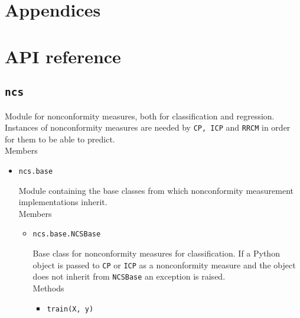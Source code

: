 \documentclass[twoside,11pt]{article}
\begin{document}
\renewcommand{\appendixpagename}{}
\begin{appendices}
  \section*{Appendices}

  \section{API reference}
  \label{appendix:a}

    \subsection*{\texttt{ncs}}

      Module for nonconformity measures, both for
      classification and regression.
      Instances of nonconformity measures are needed by
      \texttt{CP, ICP} and \texttt{RRCM} in order for them
      to be able to predict.
      \\

      Members

      \begin{itemize}

        \item
          \texttt{ncs.base}

          Module containing the base classes from which
          nonconformity measurement implementations
          inherit.
          \\

          Members

          \begin{itemize}

            \item
              \texttt{ncs.base.NCSBase}
              \label{itm:ncsbase}

              Base class for nonconformity measures for
              classification.
              If a Python object is passed to \texttt{CP}
              or \texttt{ICP} as a nonconformity measure
              and the object does not inherit from
              \texttt{NCSBase} an exception is raised.
              \\

              Methods

              \begin{itemize}

                \item
                  \texttt{train(X, y)}
                  \label{itm:ncsbase_train}


\end{itemize}
\end{itemize}
\end{itemize}
\end{appendices}
\end{document}
